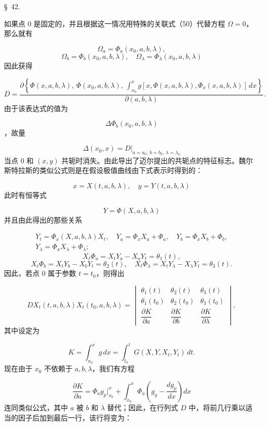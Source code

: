 \documentclass[11pt,a4paper,leqno]{article}
\begin{document}
\begin{center}
{\large \S~42.}
\end{center}
如果点 0 是固定的，并且根据这一情况用特殊的关联式（50）代替方程 $\Omega=0$，那么就有

\[
\Omega_a=\Phi_a(x_0,a,b,\lambda),
\]
\[
\Omega_b=\Phi_b(x_0,a,b,\lambda),
\quad
\Omega_\lambda=\Phi_\lambda(x_0,a,b,\lambda)
\]
因此获得

\[
D=\frac{\partial\left\{\Phi(x,a,b,\lambda),\ \Phi(x_0,a,b,\lambda),\ \displaystyle\int_{x_0}^{x}g[x,\Phi(x,a,b,\lambda),\Phi_x(x,a,b,\lambda)]\,dx\right\}}{\partial(a,b,\lambda)}.
\]
由于该表达式的值为

\[
\Delta\Phi_b(x_0,a,b,\lambda)
\]
，故量

\[
\Delta(x_0,x)=D\big|_{a=a_0,\,b=b_0,\,\lambda=\lambda_0}
\]
当点 0 和 $(x,y)$ 共轭时消失。由此导出了迈尔提出的共轭点的特征标志。魏尔斯特拉斯的类似公式则是在假设极值曲线由下式表示时得到的：

\begin{equation}\tag{57}
x=X(t,a,b,\lambda),
\quad y=Y(t,a,b,\lambda)
\end{equation}
此时有恒等式

\[
Y=\Phi(X,a,b,\lambda)
\]
并且由此得出的那些关系

\[
\begin{gathered}
Y_t=\Phi_x(X,a,b,\lambda)X_t,
\quad Y_a=\Phi_xX_a+\Phi_a,
\quad Y_b=\Phi_xX_b+\Phi_b,\\
Y_\lambda=\Phi_xX_\lambda+\Phi_\lambda;
\end{gathered}
\]
\[
X_t\Phi_a=X_tY_a-X_aY_t=\theta_1(t),
\]
\[
X_t\Phi_b=X_tY_b-X_bY_t=\theta_2(t),
\quad
X_t\Phi_\lambda=X_tY_\lambda-X_\lambda Y_t=\theta_3(t).
\]
因此，若点 0 属于参数 $t=t_0$，则得出

\[
D X_t(t,a,b,\lambda)X_t(t_0,a,b,\lambda)=
\begin{vmatrix}
\theta_1(t)&\theta_2(t)&\theta_3(t)\\
\theta_1(t_0)&\theta_2(t_0)&\theta_3(t_0)\\[.6ex]
\dfrac{\partial K}{\partial a}&\dfrac{\partial K}{\partial b}&\dfrac{\partial K}{\partial\lambda}
\end{vmatrix},
\]
其中设定为

\[
K=\int_{x_0}^{x}g\,dx=\int_{t_0}^{t}G(X,Y,X_t,Y_t)\,dt.
\]
现在由于 $x_0$ 不依赖于 $a,b,\lambda$，我们有方程

\[
\frac{\partial K}{\partial a}=\Phi_a g_p\bigg|_{x_0}^{x}+\int_{x_0}^{x}\Phi_a\left(g_y-\frac{dg_p}{dx}\right)dx
\]
连同类似公式，其中 $a$ 被 $b$ 和 $\lambda$ 替代；因此，在行列式 $D$ 中，将前几行乘以适当的因子后加到最后一行，该行将变为：
\end{document}

